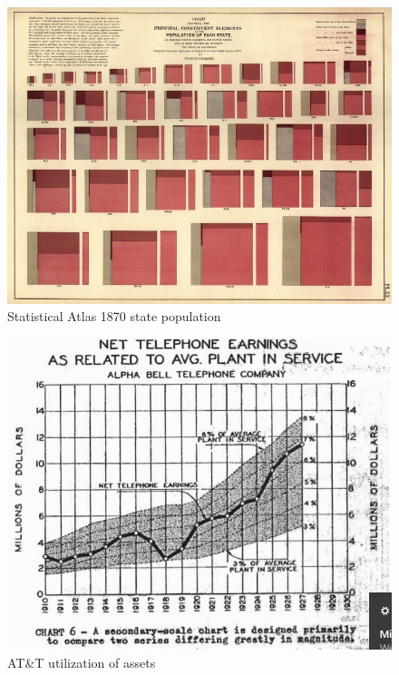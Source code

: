 \documentclass[print]{nuthesis}
\begin{document}
\begin{figure}[tbp]

{\centering \includegraphics[width=0.85\linewidth,]{images/statistical-atlas-state-population} 

}

\caption{Statistical Atlas 1870 state population}\label{fig:statistical-atlas-state-population}
\end{figure}

\begin{figure}[tbp]

{\centering \includegraphics[width=0.85\linewidth,]{images/ATandT-revenue} 

}

\caption{AT\&T utilization of assets}\label{fig:ATandT-revenue}
\end{figure}
\end{document}
